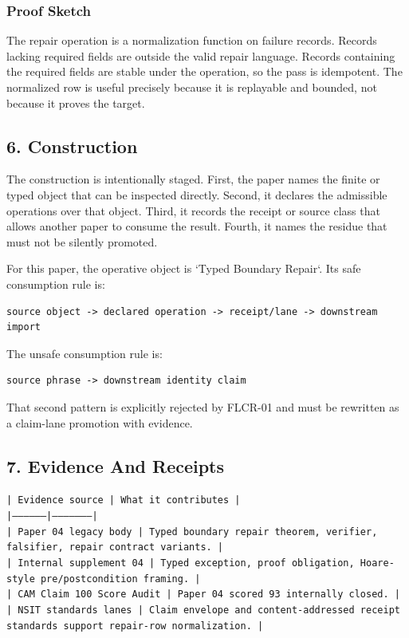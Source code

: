 \documentclass[11pt]{article}
\begin{document}
\subsubsection*{Proof Sketch}

The repair operation is a normalization function on failure records. Records lacking required fields are outside the valid repair language. Records containing the required fields are stable under the operation, so the pass is idempotent. The normalized row is useful precisely because it is replayable and bounded, not because it proves the target.

\subsection*{6. Construction}

The construction is intentionally staged. First, the paper names the finite or
typed object that can be inspected directly. Second, it declares the admissible
operations over that object. Third, it records the receipt or source class that
allows another paper to consume the result. Fourth, it names the residue that
must not be silently promoted.

For this paper, the operative object is `Typed Boundary Repair`. Its safe consumption
rule is:

\begin{verbatim}
source object -> declared operation -> receipt/lane -> downstream import
\end{verbatim}

The unsafe consumption rule is:

\begin{verbatim}
source phrase -> downstream identity claim
\end{verbatim}

That second pattern is explicitly rejected by FLCR-01 and must be rewritten as
a claim-lane promotion with evidence.

\subsection*{7. Evidence And Receipts}

\noindent\texttt{| Evidence source | What it contributes |}\\
\noindent\texttt{|-----------------|---------------------|}\\
\noindent\texttt{| Paper 04 legacy body | Typed boundary repair theorem, verifier, falsifier, repair contract variants. |}\\
\noindent\texttt{| Internal supplement 04 | Typed exception, proof obligation, Hoare-style pre/postcondition framing. |}\\
\noindent\texttt{| CAM Claim 100 Score Audit | Paper 04 scored 93 internally closed. |}\\
\noindent\texttt{| NSIT standards lanes | Claim envelope and content-addressed receipt standards support repair-row normalization. |}\\
\end{document}
